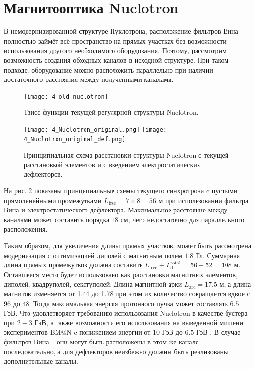 	\section{Магнитооптика Nuclotron}\label{sec:EDM/optics}
	
\par В немодернизированной структуре Нуклотрона, расположение фильтров Вина полностью займёт всё пространство на прямых участках без возможности использования другого необходимого оборудования. Поэтому, рассмотрим возможность создания обходных каналов в исходной структуре. При таком подходе, оборудование можно расположить параллельно при наличии достаточного расстояния между полученными каналами.

\begin{figure}[!h]
  \centering
	\texttt{[image: 4\_old\_nuclotron]}
   \caption{Твисс-функции текущей регулярной структуры Nuclotron.}
   \label{fig:4_old_nuclotron}
\end{figure}

\begin{figure}[!h]
  \centering
   \texttt{[image: 4\_Nuclotron\_original.png]}
   \texttt{[image: 4\_Nuclotron\_original\_def.png]}
   \caption{Принципиальная схема расстановки структуры Nuclotron с текущей расстановкой элементов и с введением электростатических дефлекторов.}
   \label{fig:4_Nuclotron_original}
\end{figure}

\noindent На рис. \ref{fig:4_Nuclotron_original} показаны принципиальные схемы текущего синхротрона c пустыми прямолинейными промежутками $L_{\textrm{free}} = 7 \times 8 = 56$ м при использовании фильтра Вина и электростатического дефлектора. Максимальное расстояние между каналами может составить порядка $18$ см, чего недостаточно для параллельного расположения.

\par Таким образом, для увеличения длины прямых участков, может быть рассмотрена модернизация с оптимизацией диполей с магнитным полем $1.8$ Тл. Суммарная длина прямых промежутков должна составить $L_{\textrm{free}}+L^{\textrm{total}}_{\textrm{d}}=56+52 = 108$ м. Оставшееся место будет использовано как расстановки магнитных элементов, диполей, квадруполей, секступолей. Длина магнитной арки $L_{\textrm{arc}}=17.5$ м, а длина магнитов изменяется от 1.44 до 1.78 при этом их количество сокращается вдвое с $96$ до $48$. Тогда максимальная энергия протонного пучка может составлять $6.5$ ГэВ. Что удовлетворяет требованию использования Nuclotron в качестве бустера при $2-3$ ГэВ, а также возможности его использования на выведенной мишени экспериментов BM@N c понижением энергии от $10$ ГэВ до $6.5$ ГэВ \cite{kovalenko:nuclotron}. В случае фильтров Вина – они могут быть расположены в этом же канале последовательно, а для дефлекторов неизбежно должны быть реализованы дополнительные каналы.


